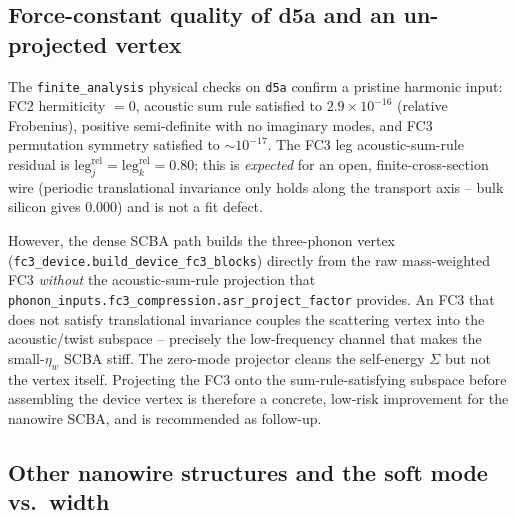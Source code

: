 \subsection{Force-constant quality of d5a and an un-projected vertex}
\label{sec:diag_fcq}

The \texttt{finite\_analysis} physical checks on \texttt{d5a} confirm a pristine harmonic
input: FC2 hermiticity $=0$, acoustic sum rule satisfied to $2.9\times10^{-16}$ (relative
Frobenius), positive semi-definite with no imaginary modes, and FC3 permutation symmetry
satisfied to $\sim10^{-17}$. The FC3 leg acoustic-sum-rule residual is
$\text{leg}_j^\text{rel}=\text{leg}_k^\text{rel}=0.80$; this is \emph{expected} for an open,
finite-cross-section wire (periodic translational invariance only holds along the transport
axis -- bulk silicon gives $0.000$) and is not a fit defect.

However, the dense SCBA path builds the three-phonon vertex
(\texttt{fc3\_device.build\_device\_fc3\_blocks}) directly from the raw mass-weighted FC3
\emph{without} the acoustic-sum-rule projection that
\texttt{phonon\_inputs.fc3\_compression.asr\_project\_factor} provides. An FC3 that does not
satisfy translational invariance couples the scattering vertex into the acoustic/twist
subspace -- precisely the low-frequency channel that makes the small-$\eta_w$ SCBA stiff. The
zero-mode projector cleans the self-energy $\Sigma$ but not the vertex itself. Projecting the
FC3 onto the sum-rule-satisfying subspace before assembling the device vertex is therefore a
concrete, low-risk improvement for the nanowire SCBA, and is recommended as follow-up.

\subsection{Other nanowire structures and the soft mode vs.\ width}
\label{sec:diag_other}

